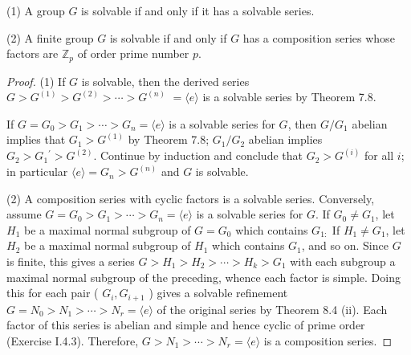 \begin{theorem}
    (1)
    A group $G$ is solvable if and only if it has a solvable series.

    (2)
    A finite group $G$ is solvable if and only if $G$ has a composition series whose factors are $\mathbb{Z}_p$ of order prime number $p$.

    \begin{proof}
        (1)
        If $G$ is solvable, then the derived series $G>G^{(1)}>G^{(2)}>\cdots>G^{(n)}$ $=\langle e\rangle$ is a solvable series by Theorem 7.8.

        If $G=G_0>G_1>\cdots>G_n=\langle e\rangle$ is a solvable series for $G$, then $G / G_1$ abelian implies that $G_1>G^{(1)}$ by Theorem 7.8; $G_1 / G_2$ abelian implies $G_2>G_1{ }^{\prime}>G^{(2)}$. Continue by induction and conclude that $G_2>G^{(i)}$ for all $i$; in particular $\langle e\rangle=G_n>G^{(n)}$ and $G$ is solvable.



        (2)
        A composition series with cyclic factors is a solvable series. Conversely, assume $G=G_0>G_1>\cdots>G_n=\langle e\rangle$ is a solvable series for $G$. If $G_0 \neq G_1$, let $H_1$ be a maximal normal subgroup of $G=G_0$ which contains $G_{1:}$ If $H_1 \neq G_1$, let $H_2$ be a maximal normal subgroup of $H_1$ which contains $G_1$, and so on. Since $G$ is finite, this gives a series $G>H_1>H_2>\cdots>H_k>G_1$ with each subgroup a maximal normal subgroup of the preceding, whence each factor is simple. Doing this for each pair ( $G_i, G_{i+1}$ ) gives a solvable refinement $G=N_0>N_1>\cdots>N_r=\langle e\rangle$ of the original series by Theorem 8.4 (ii). Each factor of this series is abelian and simple and hence cyclic of prime order (Exercise I.4.3). Therefore, $G>N_1>\cdots>N_r=\langle e\rangle$ is a composition series.
    \end{proof}
\end{theorem}



